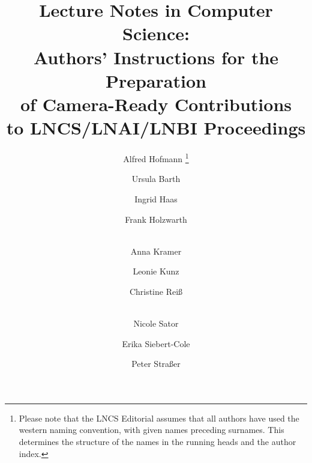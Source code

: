 \documentclass[runningheads,a4paper]{llncs}
\begin{document}


\mainmatter  %

\title{Lecture Notes in Computer Science:\\Authors' Instructions
for the Preparation\\of Camera-Ready
Contributions\\to LNCS/LNAI/LNBI Proceedings}


%
%
\author{Alfred Hofmann%
\thanks{Please note that the LNCS Editorial assumes that all authors have used
the western naming convention, with given names preceding surnames. This determines
the structure of the names in the running heads and the author index.}%
\and Ursula Barth\and Ingrid Haas\and Frank Holzwarth\and\\
Anna Kramer\and Leonie Kunz\and Christine Rei\ss\and\\
Nicole Sator\and Erika Siebert-Cole\and Peter Stra\ss er}
%


%
%

\maketitle
\end{document}
